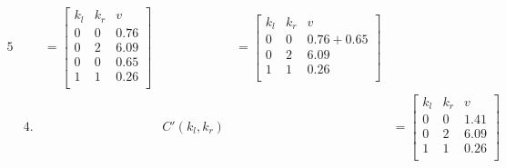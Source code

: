\begin{figure}[H]
\begin{alignat*}{5}
         &             & = \begin{bmatrix}
                               k_l & k_r & v    \\
                               0   & 0   & 0.76 \\
                               0   & 2   & 6.09 \\
                               0   & 0   & 0.65 \\
                               1   & 1   & 0.26 \\
                           \end{bmatrix}              &                & = \begin{bmatrix}
                                                               k_l & k_r & v           \\
                                                               0   & 0   & 0.76 + 0.65 \\
                                                               0   & 2   & 6.09        \\
                                                               1   & 1   & 0.26        \\
                                                           \end{bmatrix}
        \\
         & 4.       &              & C'(k_l, k_r)   &                                                                                      & = \begin{bmatrix}
                                                                                                                                                      k_l & k_r & v    \\
                                                                                                                                                      0   & 0   & 1.41 \\
                                                                                                                                                      0   & 2   & 6.09 \\
                                                                                                                                                      1   & 1   & 0.26 \\
                                                                                                                                                  \end{bmatrix}

\end{alignat*}
\end{figure}
